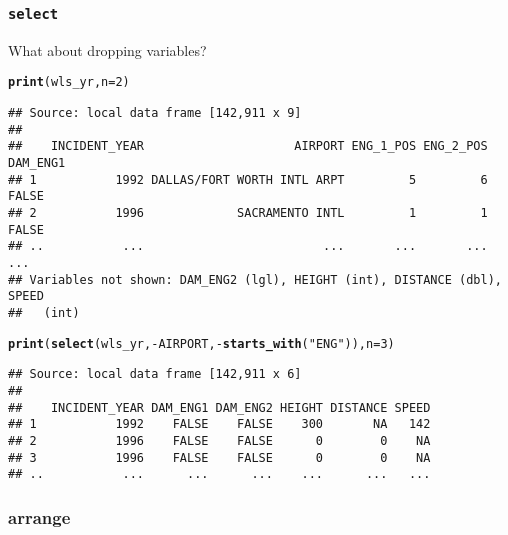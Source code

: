 \documentclass{beamer}\usepackage[]{graphicx}\usepackage[]{color}
\makeatletter
\newcommand{\hlnum}[1]{\textcolor[rgb]{0.686,0.059,0.569}{#1}}%
\newcommand{\hlstr}[1]{\textcolor[rgb]{0.192,0.494,0.8}{#1}}%
\newcommand{\hlopt}[1]{\textcolor[rgb]{0,0,0}{#1}}%
\newcommand{\hlstd}[1]{\textcolor[rgb]{0.345,0.345,0.345}{#1}}%
\newcommand{\hlkwc}[1]{\textcolor[rgb]{0.333,0.667,0.333}{#1}}%
\newcommand{\hlkwd}[1]{\textcolor[rgb]{0.737,0.353,0.396}{\textbf{#1}}}%
\newenvironment{kframe}{%
 \def\at@end@of@kframe{}%
 \ifinner\ifhmode%
  \def\at@end@of@kframe{\end{minipage}}%
  \begin{minipage}{\columnwidth}%
 \fi\fi%
 \def\FrameCommand##1{\hskip\@totalleftmargin \hskip-\fboxsep
 \colorbox{shadecolor}{##1}\hskip-\fboxsep
     \hskip-\linewidth \hskip-\@totalleftmargin \hskip\columnwidth}%
 \MakeFramed {\advance\hsize-\width
   \@totalleftmargin\z@ \linewidth\hsize
   \@setminipage}}%
 {\par\unskip\endMakeFramed%
 \at@end@of@kframe}
\newenvironment{knitrout}{}{} %
\makeatother
\begin{document}
\begin{frame}[fragile]
  \frametitle{{\tt select}}
  What about dropping variables?
\begin{knitrout}\footnotesize
{}\color{fgcolor}\begin{kframe}
\begin{alltt}
\hlkwd{print}\hlstd{(wls_yr,} \hlkwc{n} \hlstd{=} \hlnum{2}\hlstd{)}
\end{alltt}
\begin{verbatim}
## Source: local data frame [142,911 x 9]
## 
##    INCIDENT_YEAR                     AIRPORT ENG_1_POS ENG_2_POS DAM_ENG1
## 1           1992 DALLAS/FORT WORTH INTL ARPT         5         6    FALSE
## 2           1996             SACRAMENTO INTL         1         1    FALSE
## ..           ...                         ...       ...       ...      ...
## Variables not shown: DAM_ENG2 (lgl), HEIGHT (int), DISTANCE (dbl), SPEED
##   (int)
\end{verbatim}
\begin{alltt}
\hlkwd{print}\hlstd{(}\hlkwd{select}\hlstd{(wls_yr,} \hlopt{-}\hlstd{AIRPORT,} \hlopt{-}\hlkwd{starts_with}\hlstd{(}\hlstr{"ENG"}\hlstd{)),} \hlkwc{n} \hlstd{=} \hlnum{3}\hlstd{)}
\end{alltt}
\begin{verbatim}
## Source: local data frame [142,911 x 6]
## 
##    INCIDENT_YEAR DAM_ENG1 DAM_ENG2 HEIGHT DISTANCE SPEED
## 1           1992    FALSE    FALSE    300       NA   142
## 2           1996    FALSE    FALSE      0        0    NA
## 3           1996    FALSE    FALSE      0        0    NA
## ..           ...      ...      ...    ...      ...   ...
\end{verbatim}
\end{kframe}
\end{knitrout}
\end{frame} 

\subsubsection{arrange}%
\end{document}
